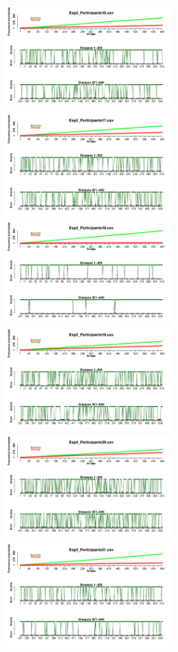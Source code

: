\documentclass[a4paper ]{article}
\begin{document}
\begin{figure}[th]
\begin{center}
\includegraphics[width=8cm, height=4cm]{Figures/Success_Exp2_P16} \includegraphics[width=8cm, height=4cm]{Figures/Success_Exp2_P17} \includegraphics[width=8cm, height=4cm]{Figures/Success_Exp2_P18}
\includegraphics[width=8cm, height=4cm]{Figures/Success_Exp2_P19} \includegraphics[width=8cm, height=4cm]{Figures/Success_Exp2_P20} \includegraphics[width=8cm, height=4cm]{Figures/Success_Exp2_P21} 
\end{center}
\end{figure}
\end{document}

